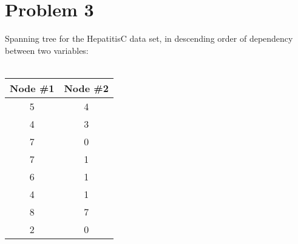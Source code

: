 \documentclass[11pt,a4paper,oneside]{report}
\begin{document}
      
\section*{Problem 3}
     
\begin{table}[H]
  \centering
  Spanning tree for the HepatitisC data set, in descending order of
dependency between two variables:\\
   \ \\
  \begin{tabular}{| c | c |}
    \hline
    Node \#1 & Node \#2\\
    \hline
      5 & 4 \\
    \hline
      4 & 3 \\
    \hline
      7 & 0 \\
    \hline
      7 & 1 \\
    \hline
      6 & 1 \\
    \hline
      4 & 1 \\
    \hline
      8 & 7 \\
    \hline
      2 & 0 \\
    \hline
  \end{tabular}
\end{table}
 
\end{document}
